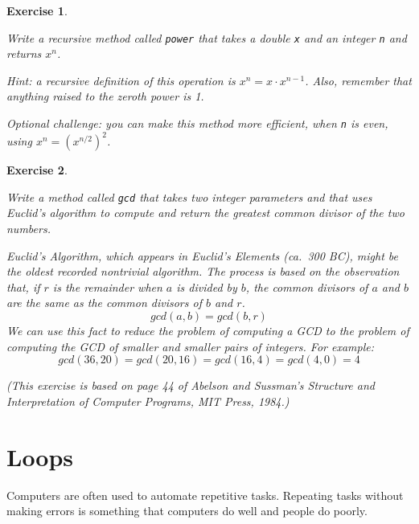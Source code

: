 \documentclass[12pt]{book}
\theoremstyle{exercise}
\newtheorem{exercise}{Exercise}[chapter]
\newcommand{\java}[1]{\verb"#1"}
\begin{document}
\begin{exercise}
\label{ex.power}

Write a recursive method called \java{power} that takes a double \java{x} and an integer \java{n} and returns $x^n$.

Hint: a recursive definition of this operation is $x^n = x \cdot x^{n-1}$.
Also, remember that anything raised to the zeroth power is 1.

Optional challenge: you can make this method more efficient, when \java{n} is even, using $x^n = \left( x^{n/2} \right)^2$.

\end{exercise}


\begin{exercise}
\label{gcd}

Write a method called \java{gcd} that takes two integer parameters and that uses Euclid's algorithm to compute and return the greatest common divisor of the two numbers.

Euclid's Algorithm, which appears in Euclid's {\em Elements} (ca.~300 BC), might be the oldest recorded nontrivial algorithm.
The process is based on the observation that, if $r$ is the remainder when $a$ is divided by $b$, the common divisors of $a$ and $b$ are the same as the common divisors of $b$ and $r$.
\[ gcd(a, b) = gcd(b, r) \]
%
We can use this fact to reduce the problem of computing a GCD to the problem of computing the GCD of smaller and smaller pairs of integers.
For example:
\[ gcd(36, 20) = gcd(20, 16) = gcd(16, 4) = gcd(4, 0) = 4 \]


(This exercise is based on page 44 of Abelson and Sussman's {\em Structure and Interpretation of Computer Programs}, MIT Press, 1984.)

\end{exercise}


\chapter{Loops}

Computers are often used to automate repetitive tasks.
Repeating tasks without making errors is something that computers do well and people do poorly.

\end{document}
